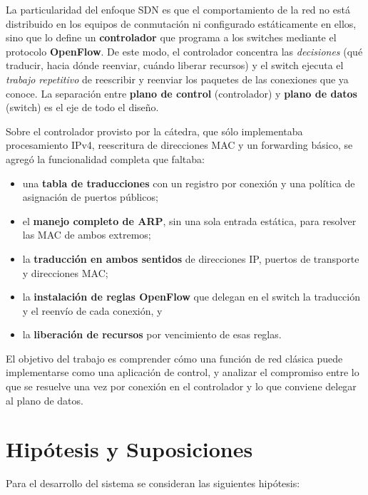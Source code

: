﻿\documentclass[10pt,a4paper]{article}
\begin{document}
La particularidad del enfoque SDN es que el comportamiento de la red no está
distribuido en los equipos de conmutación ni configurado estáticamente en ellos,
sino que lo define un \textbf{controlador} que programa a los switches mediante el
protocolo \textbf{OpenFlow}. De este modo, el controlador concentra las
\emph{decisiones} (qué traducir, hacia dónde reenviar, cuándo liberar recursos) y el
switch ejecuta el \emph{trabajo repetitivo} de reescribir y reenviar los paquetes
de las conexiones que ya conoce. La separación entre \textbf{plano de control}
(controlador) y \textbf{plano de datos} (switch) es el eje de todo el diseño.

Sobre el controlador provisto por la cátedra, que sólo implementaba procesamiento
IPv4, reescritura de direcciones MAC y un forwarding básico, se agregó la
funcionalidad completa que faltaba:

\begin{itemize}[nosep]
    \item una \textbf{tabla de traducciones} con un registro por conexión y una
          política de asignación de puertos públicos;
    \item el \textbf{manejo completo de ARP}, sin una sola entrada estática, para
          resolver las MAC de ambos extremos;
    \item la \textbf{traducción en ambos sentidos} de direcciones IP, puertos de
          transporte y direcciones MAC;
    \item la \textbf{instalación de reglas OpenFlow} que delegan en el switch la
          traducción y el reenvío de cada conexión, y
    \item la \textbf{liberación de recursos} por vencimiento de esas reglas.
\end{itemize}

El objetivo del trabajo es comprender cómo una función de red clásica puede
implementarse como una aplicación de control, y analizar el compromiso entre lo que
se resuelve una vez por conexión en el controlador y lo que conviene delegar al
plano de datos.

\section{Hipótesis y Suposiciones}
Para el desarrollo del sistema se consideran las siguientes hipótesis:
\end{document}
